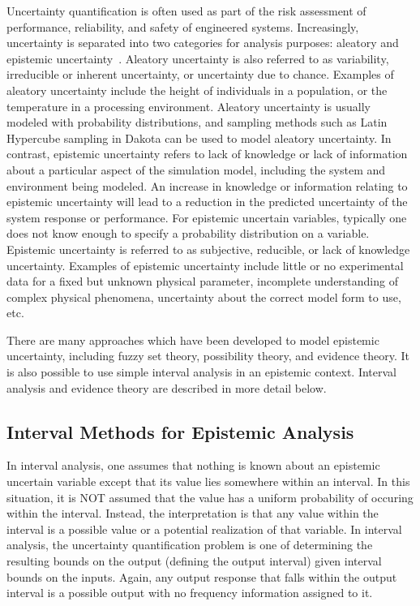 Uncertainty quantification is often used as part of the risk
assessment of performance, reliability, and safety of engineered
systems. Increasingly, uncertainty is separated into two categories
for analysis purposes: aleatory and epistemic
uncertainty~\cite{Obe03,Hel07}. Aleatory uncertainty is also referred to as
variability, irreducible or inherent uncertainty, or uncertainty due
to chance. Examples of aleatory uncertainty include the height of
individuals in a population, or the temperature in a processing
environment. Aleatory uncertainty is usually modeled with probability
distributions, and sampling methods such as Latin Hypercube sampling
in Dakota can be used to model aleatory uncertainty. In contrast,
epistemic uncertainty refers to lack of knowledge or lack of
information about a particular aspect of the simulation model,
including the system and environment being modeled. An increase in
knowledge or information relating to epistemic uncertainty will lead
to a reduction in the predicted uncertainty of the system response or
performance. For epistemic uncertain variables, typically one does not
know enough to specify a probability distribution on a variable.
Epistemic uncertainty is referred to as subjective, reducible, or lack
of knowledge uncertainty. Examples of epistemic uncertainty include
little or no experimental data for a fixed but unknown physical
parameter, incomplete understanding of complex physical phenomena,
uncertainty about the correct model form to use, etc.

There are many approaches which have been developed to model epistemic
uncertainty, including fuzzy set theory, possibility theory, and
evidence theory. It is also possible to use simple interval analysis in 
an epistemic context. Interval analysis and evidence theory are 
described in more detail below.

\subsection{Interval Methods for Epistemic Analysis}\label{uq:interval}

In interval analysis, one assumes that nothing is known about 
an epistemic uncertain variable except that its value lies 
somewhere within an interval. In this situation, it is NOT 
assumed that the value has a uniform probability of occuring 
within the interval. Instead, the interpretation is that 
any value within the interval is a possible value or a potential 
realization of that variable. In interval analysis, the 
uncertainty quantification problem is one of determining the 
resulting bounds on the output (defining the output interval) 
given interval bounds on the inputs. Again, any output response 
that falls within the output interval is a possible output 
with no frequency information assigned to it.

